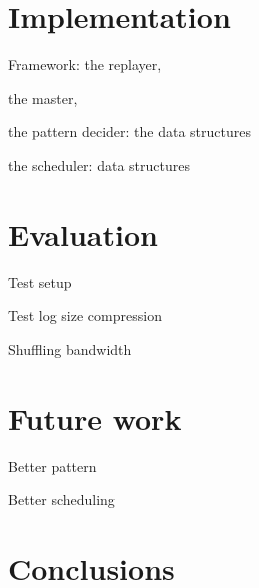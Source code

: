 \documentclass{acm_proc_article-sp}
\begin{document}
\section{Implementation}

Framework: 
the replayer, 

the master, 

the pattern decider: the data structures

the scheduler: data structures


\section{Evaluation}
Test setup

Test log size compression

Shuffling bandwidth


\section{Future work}
Better pattern

Better scheduling


\section{Conclusions}






  
\end{document}
